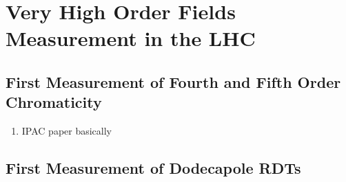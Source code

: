 \chapter{Very High Order Fields Measurement in the LHC}
\thumbforchapter{}
\chaptertoc{}
\newpage

\section{First Measurement of Fourth and Fifth Order Chromaticity}

\begin{enumerate}
\color{red}
    \item IPAC paper basically
\end{enumerate}


\section{First Measurement of Dodecapole RDTs}